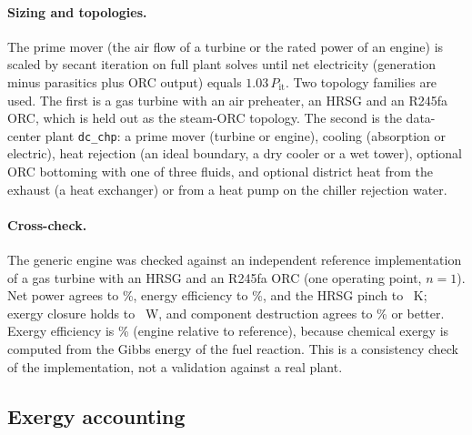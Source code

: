 \paragraph{Sizing and topologies.}
The prime mover (the air flow of a turbine or the rated power of an engine) is scaled by secant iteration on full
plant solves until net electricity (generation minus parasitics plus ORC output) equals $1.03\,P_{\mathrm{it}}$. Two
topology families are used. The first is a gas turbine with an air preheater, an HRSG and an R245fa ORC, which is held
out as the steam-ORC topology. The second is the data-center plant \texttt{dc\_chp}: a prime mover (turbine or engine), cooling
(absorption or electric), heat rejection (an ideal boundary, a dry cooler or a wet tower), optional ORC bottoming with
one of three fluids, and optional district heat from the exhaust (a heat exchanger) or from a heat pump on the chiller
rejection water.

\paragraph{Cross-check.}
The generic engine was checked against an independent reference implementation of a gas turbine with an HRSG and an
R245fa ORC (one operating point, $n=1$). Net power agrees to \%, energy efficiency to
\%, and the HRSG pinch to ~K; exergy closure holds to
~W, and component destruction agrees to \% or better. Exergy efficiency is
\% (engine relative to reference), because chemical exergy is computed from the Gibbs energy of
the fuel reaction. This is a consistency check of the implementation, not a validation against a real plant.

\begin{table}[tbp]
\centering

\caption{Assumed technology constants with their code defaults (\texttt{synth/topologies.py}, \texttt{core.components}). They are model settings, not measurements.}
\label{tab:constants}
\end{table}

\subsection{Exergy accounting}\label{sec:exergy}

